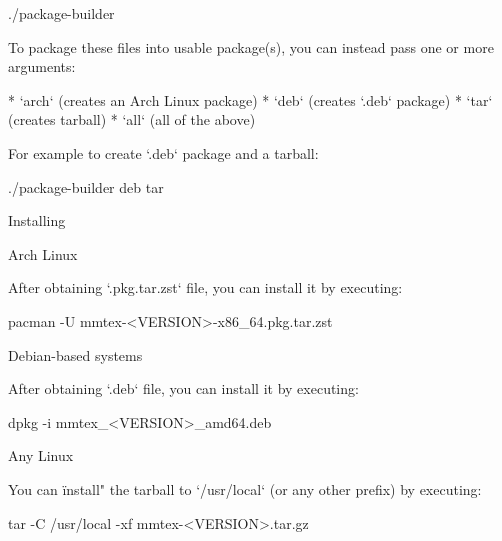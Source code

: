 \begtt
./package-builder
\endtt

To package these files into usable package(s), you can instead pass one or more
arguments:

\begitems
* `arch` (creates an Arch Linux package)
* `deb` (creates `.deb` package)
* `tar` (creates tarball)
* `all` (all of the above)
\enditems

For example to create `.deb` package and a tarball:

\begtt
./package-builder deb tar
\endtt

\sec Installing \MMTeX

\secc Arch Linux

After obtaining `.pkg.tar.zst` file, you can install it by executing:

\begtt
pacman -U mmtex-<VERSION>-x86_64.pkg.tar.zst
\endtt

\secc Debian-based systems

After obtaining `.deb` file, you can install it by executing:

\begtt
dpkg -i mmtex_<VERSION>_amd64.deb
\endtt

\secc Any Linux

You can \"install" the tarball to `/usr/local` (or any other prefix) by executing:

\begtt
tar -C /usr/local -xf mmtex-<VERSION>.tar.gz
\endtt

\bye

